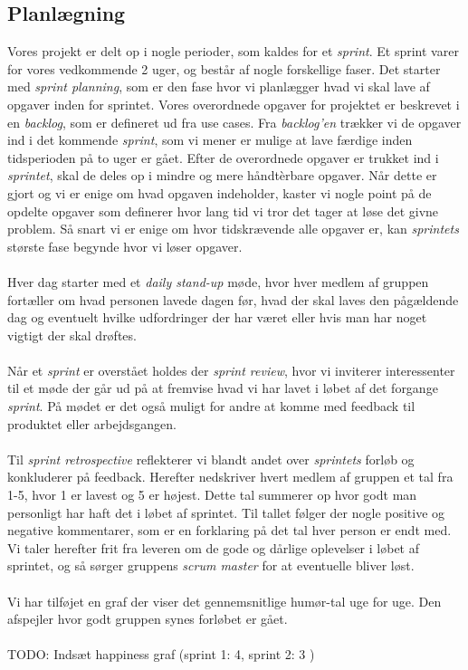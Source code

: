 \subsection{Planlægning}
Vores projekt er delt op i nogle perioder, som kaldes for et \textit{sprint}. Et sprint varer for vores vedkommende 2 uger, og består af nogle forskellige faser.
Det starter med \textit{sprint planning}, som er den fase hvor vi planlægger hvad vi skal lave af opgaver inden for sprintet. Vores overordnede opgaver for projektet er beskrevet i en \textit{backlog}, som er defineret ud fra use cases. Fra \textit{backlog'en} trækker vi de opgaver ind i det kommende \textit{sprint}, som vi mener er mulige at lave færdige inden tidsperioden på to uger er gået. Efter de overordnede opgaver er trukket ind i \textit{sprintet}, skal de deles op i mindre og mere håndtèrbare opgaver. Når dette er gjort og vi er enige om hvad opgaven indeholder, kaster vi nogle point på de opdelte opgaver som definerer hvor lang tid vi tror det tager at løse det givne problem. Så snart vi er enige om hvor tidskrævende alle opgaver er, kan \textit{sprintets} største fase begynde hvor vi løser opgaver.
\\\\
Hver dag starter med et \textit{daily stand-up} møde, hvor hver medlem af gruppen fortæller om hvad personen lavede dagen før, hvad der skal laves den pågældende dag og eventuelt hvilke udfordringer der har været eller hvis man har noget vigtigt der skal drøftes.
\\\\
Når et \textit{sprint} er overstået holdes der \textit{sprint review}, hvor vi inviterer interessenter til et møde der går ud på at fremvise hvad vi har lavet i løbet af det forgange \textit{sprint}. På mødet er det også muligt for andre at komme med feedback til produktet eller arbejdsgangen.
\\\\
Til \textit{sprint retrospective} reflekterer vi blandt andet over \textit{sprintets} forløb og konkluderer på feedback. Herefter nedskriver hvert medlem af gruppen et tal fra 1-5, hvor 1 er lavest og 5 er højest. Dette tal summerer op hvor godt man personligt har haft det i løbet af sprintet. Til tallet følger der nogle positive og negative kommentarer, som er en forklaring på det tal hver person er endt med. Vi taler herefter frit fra leveren om de gode og dårlige oplevelser i løbet af sprintet, og så sørger gruppens \textit{scrum master} for at eventuelle bliver løst.
\\\\
Vi har tilføjet en graf der viser det gennemsnitlige humør-tal uge for uge. Den afspejler hvor godt gruppen synes forløbet er gået.
\\\\
TODO: Indsæt happiness graf (sprint 1: 4, sprint 2: 3 )
